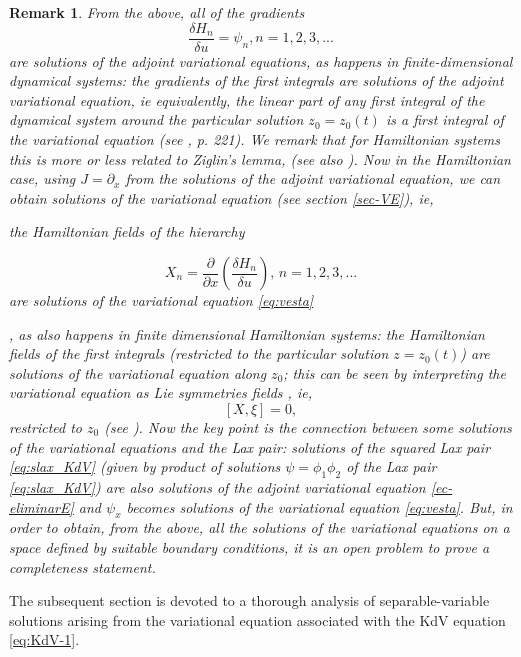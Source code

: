 \documentclass[a4paper,12pt]{article}
\newtheorem{rem}[thm]{Remark}
\begin{document}
\begin{rem}
    



  {\it From the above, all of the gradients
{
$$\dfrac{\delta H_n}{\delta u}=\psi_n, n=1,2,3,...$$
}
are solutions of the adjoint variational equations}, as happens in finite-dimensional dynamical systems: the gradients of the first integrals are solutions of the adjoint variational equation, ie equivalently, the linear part of any  first integral of the dynamical system around the particular solution $z_0=z_0(t)$ is a first integral of the variational equation (see \cite{AMV}, p. 221). We remark  that for Hamiltonian systems this is more or less related  to Ziglin's lemma,  \cite{zi1,MR} (see also  \cite{morales}). Now in the Hamiltonian case, using $J=\partial_x$ from the solutions of the adjoint variational equation, we can obtain solutions of the variational equation (see section \ref{sec-VE}), ie, {\it the Hamiltonian fields of the hierarchy

$$X_n=\dfrac\partial{\partial x}\left(\dfrac{\delta H_n}{\delta u}\right), \, n=1,2,3,...$$
 are solutions of the variational equation \eqref{eq:vesta} }, as also happens in finite dimensional Hamiltonian systems: the Hamiltonian fields of the first integrals (restricted to the particular solution $z=z_0(t)$) are solutions of the variational equation along $z_0$; this can be seen by interpreting the variational equation as Lie symmetries fields , ie, $$[X, \xi]=0,$$
 restricted to  $z_0$ (see \cite{BCRS}). Now the key point is the connection between some solutions of the variational equations and the Lax pair: {\it solutions of  the squared Lax pair \eqref{eq:slax_KdV}  (given by product of solutions $\psi=\phi_1\phi_2$ of the Lax pair \eqref{eq:slax_KdV})  are also solutions of the adjoint variational equation \eqref{ec-eliminarE} and $\psi_x$ becomes solutions of the variational equation \eqref{eq:vesta}}. But, in order to obtain, from the above, {\it all the solutions of the variational equations on a  space defined by suitable boundary conditions,  it is an open problem to  prove a  completeness statement}.


\end{rem}




The subsequent section is devoted to a thorough analysis of separable-variable solutions arising from the variational equation associated with the KdV equation \eqref{eq:KdV-1}.
\end{document}
